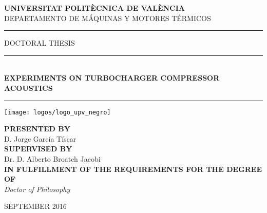 \documentclass[final,twoside,11pt]{book}
\makeatletter
\numberwithin{equation}{section}
\numberwithin{figure}{chapter}
\numberwithin{table}{chapter}
\def\cleardoublepage{\clearpage\if@twoside \ifodd\c@page\else
  \hbox{}
  \thispagestyle{empty}
  \newpage
  \if@twocolumn\hbox{}\newpage\fi\fi\fi}
\makeatother
\begin{document}

%

\enlargethispage{5cm}
\begin{center}
\Large\cabin\textbf{UNIVERSITAT POLITÈCNICA DE VALÈNCIA}\\[1mm]
\large DEPARTAMENTO DE MÁQUINAS Y MOTORES TÉRMICOS\\
\vspace{1cm}

\rule[0.3\baselineskip]{3.8cm}{0.4pt}
\noindent\cabin\large{\hspace{2mm}DOCTORAL THESIS\hspace{2mm}}
\rule[0.3\baselineskip]{3.8cm}{0.4pt}
\vspace{2mm}\\
\huge\textbf{EXPERIMENTS ON TURBOCHARGER COMPRESSOR ACOUSTICS}\\
\vspace{-2.5mm}
\rule{\textwidth}{0.4pt}
\vspace{1cm}

\texttt{[image: logos/logo\_upv\_negro]}

\vspace{1.3cm}

{\normalsize\bfseries\cabincondensed PRESENTED BY}\\
\rm\Large D. Jorge García Tíscar\\[4mm]
{\normalsize\bfseries\cabincondensed SUPERVISED BY}\\
\rm\Large Dr. D. Alberto Broatch Jacobi\\[10mm]

{\normalsize\bfseries\cabincondensed IN FULFILLMENT OF THE REQUIREMENTS FOR THE DEGREE OF}\\[2mm]
\it\Large Doctor of Philosophy

\vspace{1.2cm}

\footnotesize\rm\cabin SEPTEMBER 2016
\end{center}
\cleardoublepage
\end{document}
